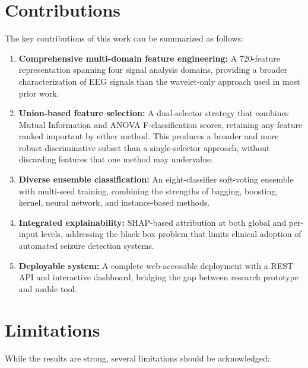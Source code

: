 \section{Contributions}

The key contributions of this work can be summarized as follows:

\begin{enumerate}
    \item \textbf{Comprehensive multi-domain feature engineering:} A 720-feature representation spanning four signal analysis domains, providing a broader characterization of EEG signals than the wavelet-only approach used in most prior work.

    \item \textbf{Union-based feature selection:} A dual-selector strategy that combines Mutual Information and ANOVA F-classification scores, retaining any feature ranked important by either method. This produces a broader and more robust discriminative subset than a single-selector approach, without discarding features that one method may undervalue.

    \item \textbf{Diverse ensemble classification:} An eight-classifier soft-voting ensemble with multi-seed training, combining the strengths of bagging, boosting, kernel, neural network, and instance-based methods.
    
    \item \textbf{Integrated explainability:} SHAP-based attribution at both global and per-input levels, addressing the black-box problem that limits clinical adoption of automated seizure detection systems.
    
    \item \textbf{Deployable system:} A complete web-accessible deployment with a REST API and interactive dashboard, bridging the gap between research prototype and usable tool.
\end{enumerate}

\section{Limitations}

While the results are strong, several limitations should be acknowledged:

